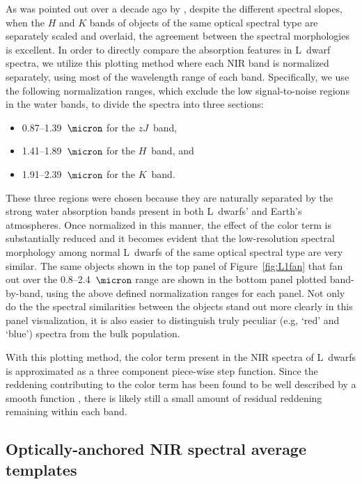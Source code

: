 \documentclass[12pt,preprint]{aastex}
\begin{document}
As was pointed out over a decade ago by \citet{Leggett:2003tm}, despite the different spectral slopes, when the $H$ and $K$ bands of objects of the same optical spectral type are separately scaled and overlaid, the agreement between the spectral morphologies is excellent.
In order to directly compare the absorption features in L~dwarf spectra, we utilize this plotting method where each NIR band is normalized separately, using most of the wavelength range of each band.
Specifically, we use the following normalization ranges, which exclude the low signal-to-noise regions in the water bands, to divide the spectra into three sections:
\begin{itemize} \itemsep1pt \parskip0pt 
\item 0.87--1.39~$\micron$ for the $zJ$~band,
\item 1.41--1.89~$\micron$ for the $H$~band, and
\item 1.91--2.39~$\micron$ for the $K$~band.
\end{itemize}
These three regions were chosen because they are naturally separated by the strong water absorption bands present in both L~dwarfs' and Earth's atmospheres.
Once normalized in this manner, the effect of the color term is substantially reduced and it becomes evident that the low-resolution spectral morphology among normal L~dwarfs of the same optical spectral type are very similar.
The same objects shown in the top panel of Figure~\ref{fig:L1fan} that fan out over the 0.8--2.4~$\micron$ range are shown in the bottom panel plotted band-by-band, using the above defined normalization ranges for each panel.
Not only do the the spectral similarities between the objects stand out more clearly in this panel visualization, it is also easier to distinguish truly peculiar (e.g, `red' and `blue') spectra from the bulk population.

With this plotting method, the color term present in the NIR spectra of L~dwarfs is approximated as a three component piece-wise step function. Since the reddening contributing to the color term has been found to be well described by a smooth function \citep{Marocco:2014kr,Hiranaka:2016va}, there is likely still a small amount of residual reddening remaining within each band.

\clearpage
\subsection{Optically-anchored NIR spectral average templates}
\label{sec:templates}
\end{document}
